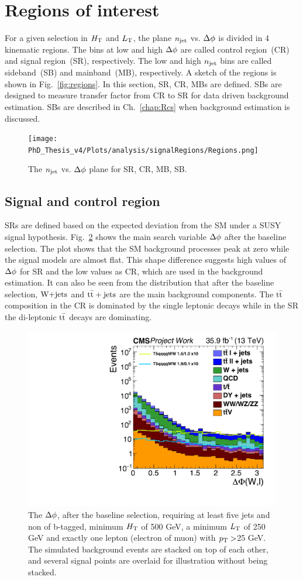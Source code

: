 \newpage
\section{Regions of interest}
\label{sec:MBSR}
For a given selection in $H_{\rm T}$ and $L_{\rm T}$, the plane $\njet$ vs. $\DF$ is divided in 4 kinematic regions.
The bins at low and high $\DF$ are called control region~(CR) and signal region~(SR), respectively.
The low and high $\njet$ bins are called sideband~(SB) and mainband~(MB), respectively.
A sketch of the regions is shown in Fig.~\ref{fig:regions}. In this section, SR, CR, MBs are defined. SBs are designed to measure transfer factor from CR to SR for data driven background estimation. SBs are described in Ch.~\ref{chap:Rcs} when background estimation is discussed.
\begin{figure}
\label{fig:regions}
    \centering
    \texttt{[image: PhD\_Thesis\_v4/Plots/analysis/signalRegions/Regions.png]}
    \caption[Sketch of the $\njet$ vs. $\DF$ plane]{The $\njet$ vs. $\DF$ plane for SR, CR, MB, SB.}
    \label{fig:my_label}
\end{figure}
\subsection{Signal and control region}
SRs are defined based on the expected deviation from the SM under a SUSY signal hypothesis. Fig.~\ref{fig:DF} shows the main search variable $\DF$ after the baseline selection. The plot shows that the SM background processes peak at zero while the signal models are almost flat. This shape difference suggests high values of $\DF$ for SR and the low values as CR, which are used in the background estimation. It can also be seen from the distribution that after the baseline selection, $\textrm{W+jets}$ and ${\rm t\bar{t}+jets}$ are the main background components. The $\rm t\bar{t}$ composition in the CR is dominated by the single leptonic decays while in the SR the di-leptonic  $\rm t\bar{t}$ decays are dominating.
 \begin{figure}[!hbt]
    \begin{center}
 \includegraphics[width=0.5 \textwidth]{Plots/analysis/signalRegions/deltaPhi_Wl_narrownormal}
  \caption[The $\DF$, after the baseline selection, MC only]{ \label{fig:DF} The $\DF$, after the baseline selection, requiring at least five jets and non of b-tagged, minimum $H_{\rm T}$ of 500 GeV, a minimum $L_{\rm T}$ of 250 GeV and exactly one lepton (electron of muon) with $p_{\rm T} >$25 GeV. The simulated background events are stacked on top of each other, and several signal points are overlaid for illustration without being stacked.
  }
   \end{center}
\end{figure}
